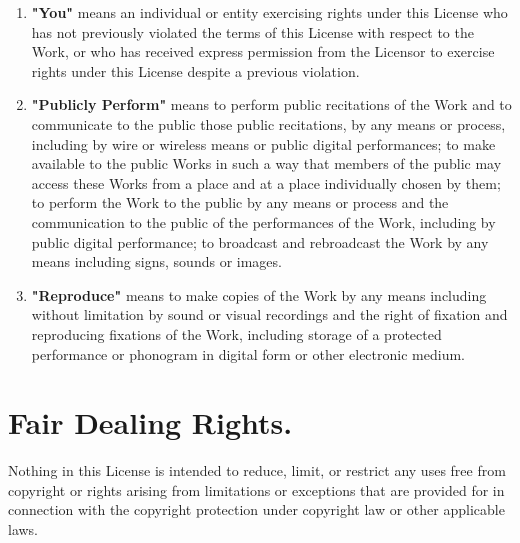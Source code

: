\documentclass[10pt]{book}
\begin{document}
\begin{enumerate}
	\item \textbf{"You"} means an individual or entity           exercising rights under this License who has not           previously violated the terms of this License with           respect to the Work, or who has received express           permission from the Licensor to exercise rights under           this License despite a previous violation.
	\item \textbf{"Publicly Perform"} means to perform           public recitations of the Work and to communicate to the           public those public recitations, by any means or process,           including by wire or wireless means or public digital           performances; to make available to the public Works in           such a way that members of the public may access these           Works from a place and at a place individually chosen by           them; to perform the Work to the public by any means or           process and the communication to the public of the           performances of the Work, including by public digital           performance; to broadcast and rebroadcast the Work by any           means including signs, sounds or images.
	\item \textbf{"Reproduce"} means to make copies of           the Work by any means including without limitation by           sound or visual recordings and the right of fixation and           reproducing fixations of the Work, including storage of a           protected performance or phonogram in digital form or           other electronic medium.
\end{enumerate}

\section{ Fair Dealing Rights.} Nothing in this         License is intended to reduce, limit, or restrict any uses         free from copyright or rights arising from limitations or         exceptions that are provided for in connection with the         copyright protection under copyright law or other         applicable laws.
\end{document}
